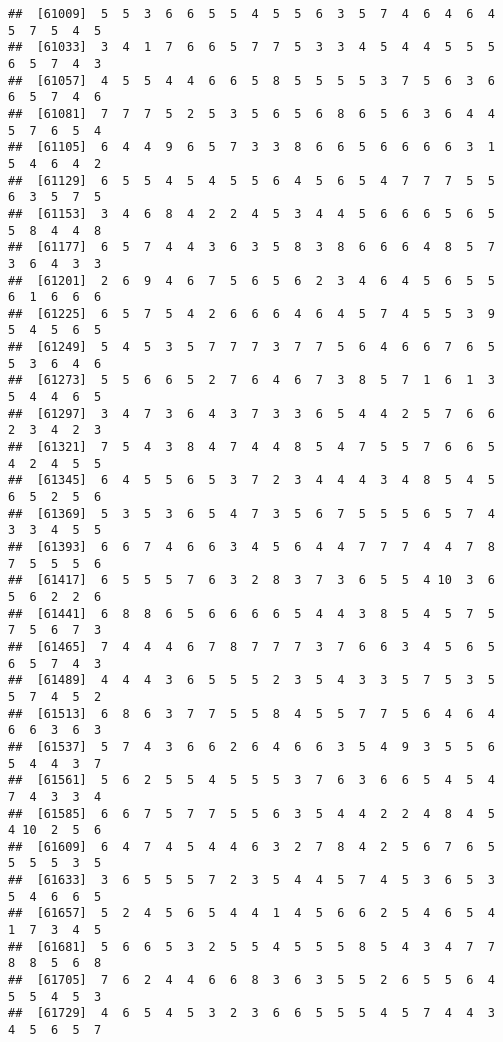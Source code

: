 \documentclass[
]{book}
\begin{document}
\begin{verbatim}
##  [61009]  5  5  3  6  6  5  5  4  5  5  6  3  5  7  4  6  4  6  4  5  7  5  4  5
##  [61033]  3  4  1  7  6  6  5  7  7  5  3  3  4  5  4  4  5  5  5  6  5  7  4  3
##  [61057]  4  5  5  4  4  6  6  5  8  5  5  5  5  3  7  5  6  3  6  6  5  7  4  6
##  [61081]  7  7  7  5  2  5  3  5  6  5  6  8  6  5  6  3  6  4  4  5  7  6  5  4
##  [61105]  6  4  4  9  6  5  7  3  3  8  6  6  5  6  6  6  6  3  1  5  4  6  4  2
##  [61129]  6  5  5  4  5  4  5  5  6  4  5  6  5  4  7  7  7  5  5  6  3  5  7  5
##  [61153]  3  4  6  8  4  2  2  4  5  3  4  4  5  6  6  6  5  6  5  5  8  4  4  8
##  [61177]  6  5  7  4  4  3  6  3  5  8  3  8  6  6  6  4  8  5  7  3  6  4  3  3
##  [61201]  2  6  9  4  6  7  5  6  5  6  2  3  4  6  4  5  6  5  5  6  1  6  6  6
##  [61225]  6  5  7  5  4  2  6  6  6  4  6  4  5  7  4  5  5  3  9  5  4  5  6  5
##  [61249]  5  4  5  3  5  7  7  7  3  7  7  5  6  4  6  6  7  6  5  5  3  6  4  6
##  [61273]  5  5  6  6  5  2  7  6  4  6  7  3  8  5  7  1  6  1  3  5  4  4  6  5
##  [61297]  3  4  7  3  6  4  3  7  3  3  6  5  4  4  2  5  7  6  6  2  3  4  2  3
##  [61321]  7  5  4  3  8  4  7  4  4  8  5  4  7  5  5  7  6  6  5  4  2  4  5  5
##  [61345]  6  4  5  5  6  5  3  7  2  3  4  4  4  3  4  8  5  4  5  6  5  2  5  6
##  [61369]  5  3  5  3  6  5  4  7  3  5  6  7  5  5  5  6  5  7  4  3  3  4  5  5
##  [61393]  6  6  7  4  6  6  3  4  5  6  4  4  7  7  7  4  4  7  8  7  5  5  5  6
##  [61417]  6  5  5  5  7  6  3  2  8  3  7  3  6  5  5  4 10  3  6  5  6  2  2  6
##  [61441]  6  8  8  6  5  6  6  6  6  5  4  4  3  8  5  4  5  7  5  7  5  6  7  3
##  [61465]  7  4  4  4  6  7  8  7  7  7  3  7  6  6  3  4  5  6  5  6  5  7  4  3
##  [61489]  4  4  4  3  6  5  5  5  2  3  5  4  3  3  5  7  5  3  5  5  7  4  5  2
##  [61513]  6  8  6  3  7  7  5  5  8  4  5  5  7  7  5  6  4  6  4  6  6  3  6  3
##  [61537]  5  7  4  3  6  6  2  6  4  6  6  3  5  4  9  3  5  5  6  5  4  4  3  7
##  [61561]  5  6  2  5  5  4  5  5  5  3  7  6  3  6  6  5  4  5  4  7  4  3  3  4
##  [61585]  6  6  7  5  7  7  5  5  6  3  5  4  4  2  2  4  8  4  5  4 10  2  5  6
##  [61609]  6  4  7  4  5  4  4  6  3  2  7  8  4  2  5  6  7  6  5  5  5  5  3  5
##  [61633]  3  6  5  5  5  7  2  3  5  4  4  5  7  4  5  3  6  5  3  5  4  6  6  5
##  [61657]  5  2  4  5  6  5  4  4  1  4  5  6  6  2  5  4  6  5  4  1  7  3  4  5
##  [61681]  5  6  6  5  3  2  5  5  4  5  5  5  8  5  4  3  4  7  7  8  8  5  6  8
##  [61705]  7  6  2  4  4  6  6  8  3  6  3  5  5  2  6  5  5  6  4  5  5  4  5  3
##  [61729]  4  6  5  4  5  3  2  3  6  6  5  5  5  4  5  7  4  4  3  4  5  6  5  7

\end{verbatim}
\end{document}
